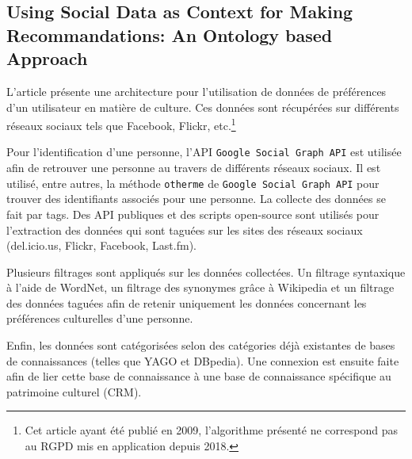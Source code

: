 \documentclass{article}
\begin{document}
    \subsection{Using Social Data as Context for Making Recommandations: An Ontology based Approach}
        L'article \cite{noor_et_al._2009} présente une architecture pour l'utilisation de données de préférences d’un utilisateur en matière de culture. Ces données sont récupérées sur différents réseaux sociaux tels que Facebook, Flickr, etc.\footnote{Cet article ayant été publié en 2009, l’algorithme présenté ne correspond pas au RGPD mis en application depuis 2018.} \par
        Pour l'identification d'une personne, l'API \texttt{Google Social Graph API} est utilisée afin de retrouver une personne au travers de différents réseaux sociaux. 
        Il est utilisé, entre autres, la méthode \texttt{otherme} de \texttt{Google Social Graph API} pour trouver des identifiants associés pour une personne. 
        La collecte des données se fait par tags. 
        Des API publiques et des scripts open-source sont utilisés pour l’extraction des données qui sont taguées sur les sites des réseaux sociaux (del.icio.us, Flickr, Facebook, Last.fm).\par
        Plusieurs filtrages sont appliqués sur les données collectées.
        Un filtrage syntaxique à l'aide de WordNet, un filtrage des synonymes grâce à Wikipedia et un filtrage des données taguées afin de retenir uniquement les données concernant les préférences culturelles d'une personne.\par
        Enfin, les données sont catégorisées selon des catégories déjà existantes de bases de connaissances (telles que YAGO et DBpedia). 
        Une connexion est ensuite faite afin de lier cette base de connaissance à une base de connaissance spécifique au patrimoine culturel (CRM).
\end{document}
